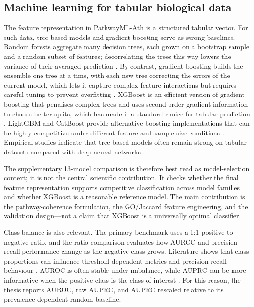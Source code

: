 \documentclass[12pt,twoside]{article}
\begin{document}
\subsection{Machine learning for tabular biological data}
\label{sec:lit_ml_tabular}

The feature representation in PathwayML-Ath is a structured tabular vector. For such data, tree-based models and gradient boosting serve as strong baselines. Random forests aggregate many decision trees, each grown on a bootstrap sample and a random subset of features; decorrelating the trees this way lowers the variance of their averaged prediction \citep{breiman2001random}. By contrast, gradient boosting builds the ensemble one tree at a time, with each new tree correcting the errors of the current model, which lets it capture complex feature interactions but requires careful tuning to prevent overfitting \citep{friedman2001greedy}. XGBoost is an efficient version of gradient boosting that penalises complex trees and uses second-order gradient information to choose better splits, which has made it a standard choice for tabular prediction \citep{chen2016xgboost}. LightGBM and CatBoost provide alternative boosting implementations that can be highly competitive under different feature and sample-size conditions \citep{ke2017lightgbm,prokhorenkova2018catboost}. Empirical studies indicate that tree-based models often remain strong on tabular datasets compared with deep neural networks \citep{grinsztajn2022why}.

The supplementary 13-model comparison is therefore best read as model-selection context; it is not the central scientific contribution. It checks whether the final feature representation supports competitive classification across model families and whether XGBoost is a reasonable reference model. The main contribution is the pathway-coherence formulation, the GO/Jaccard feature engineering, and the validation design---not a claim that XGBoost is a universally optimal classifier.

Class balance is also relevant. The primary benchmark uses a 1:1 positive-to-negative ratio, and the ratio comparison evaluates how AUROC and precision--recall performance change as the negative class grows. Literature shows that class proportions can influence threshold-dependent metrics and precision-recall behaviour \citep{japkowicz2002class}. AUROC is often stable under imbalance, while AUPRC can be more informative when the positive class is the class of interest \citep{saito2015precision}. For this reason, the thesis reports AUROC, raw AUPRC, and AUPRC rescaled relative to its prevalence-dependent random baseline.
\end{document}
